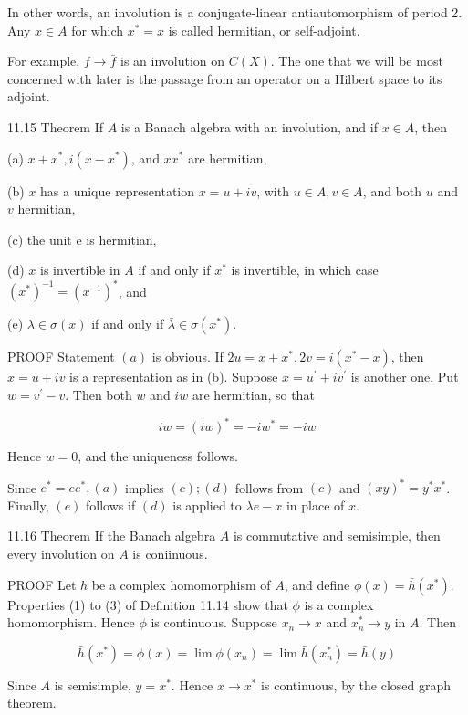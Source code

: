 \documentclass[10pt]{article}
\begin{document}
In other words, an involution is a conjugate-linear antiautomorphism of period 2. Any $x \in A$ for which $x^{*}=x$ is called hermitian, or self-adjoint.

For example, $f \rightarrow \bar{f}$ is an involution on $C(X)$. The one that we will be most concerned with later is the passage from an operator on a Hilbert space to its adjoint.

11.15 Theorem If $A$ is a Banach algebra with an involution, and if $x \in A$, then

(a) $x+x^{*}, i\left(x-x^{*}\right)$, and $x x^{*}$ are hermitian,

(b) $x$ has a unique representation $x=u+i v$, with $u \in A, v \in A$, and both $u$ and $v$ hermitian,

(c) the unit e is hermitian,

(d) $x$ is invertible in $A$ if and only if $x^{*}$ is invertible, in which case $\left(x^{*}\right)^{-1}=\left(x^{-1}\right)^{*}$, and

(e) $\lambda \in \sigma(x)$ if and only if $\bar{\lambda} \in \sigma\left(x^{*}\right)$.

PROOF Statement $(a)$ is obvious. If $2 u=x+x^{*}, 2 v=i\left(x^{*}-x\right)$, then $x=u+i v$ is a representation as in (b). Suppose $x=u^{\prime}+i v^{\prime}$ is another one. Put $w=v^{\prime}-v$. Then both $w$ and $i w$ are hermitian, so that

$$
i w=(i w)^{*}=-i w^{*}=-i w
$$

Hence $w=0$, and the uniqueness follows.

Since $e^{*}=e e^{*},(a)$ implies $(c) ;(d)$ follows from $(c)$ and $(x y)^{*}=y^{*} x^{*}$. Finally, $(e)$ follows if $(d)$ is applied to $\lambda e-x$ in place of $x$.

11.16 Theorem If the Banach algebra $A$ is commutative and semisimple, then every involution on $A$ is coniinuous.

PROOF Let $h$ be a complex homomorphism of $A$, and define $\phi(x)=\bar{h}\left(x^{*}\right)$. Properties (1) to (3) of Definition 11.14 show that $\phi$ is a complex homomorphism. Hence $\phi$ is continuous. Suppose $x_{n} \rightarrow x$ and $x_{n}^{*} \rightarrow y$ in $A$. Then

$$
\bar{h}\left(x^{*}\right)=\phi(x)=\lim \phi\left(x_{n}\right)=\lim \bar{h}\left(x_{n}^{*}\right)=\bar{h}(y)
$$

Since $A$ is semisimple, $y=x^{*}$. Hence $x \rightarrow x^{*}$ is continuous, by the closed graph theorem.
\end{document}
